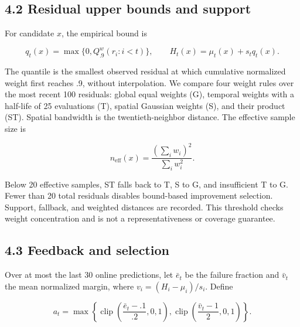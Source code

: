 \documentclass[11pt,a4paper]{article}
\begin{document}
\par{}\noindent\begin{minipage}{\linewidth}

\hypertarget{residual-upper-bounds-and-support}{%
\subsection{4.2 Residual upper bounds and
support}\label{residual-upper-bounds-and-support}}

For candidate \(x\), the empirical bound is

\[q_t(x)=\max\{0,Q^w_{.9}(r_i:i<t)\},\qquad H_t(x)=\mu_t(x)+s_tq_t(x).\]

\end{minipage}\par

\par\noindent\begin{minipage}{\linewidth}

The quantile is the smallest observed residual at which cumulative
normalized weight first reaches .9, without interpolation. We compare
four weight rules over the most recent 100 residuals: global equal
weights (G), temporal weights with a half-life of 25 evaluations (T),
spatial Gaussian weights (S), and their product (ST). Spatial bandwidth
is the twentieth-neighbor distance. The effective sample size is

\[n_{\mathrm{eff}}(x)=\frac{(\sum_iw_i)^2}{\sum_iw_i^2}.\]

\end{minipage}\par

Below 20 effective samples, ST falls back to T, S to G, and insufficient
T to G. Fewer than 20 total residuals disables bound-based improvement
selection. Support, fallback, and weighted distances are recorded. This
threshold checks weight concentration and is not a representativeness or
coverage guarantee.

\par{}\noindent\begin{minipage}{\linewidth}

\hypertarget{feedback-and-selection}{%
\subsection{4.3 Feedback and selection}\label{feedback-and-selection}}

Over at most the last 30 online predictions, let \(\bar e_t\) be the
failure fraction and \(\bar v_t\) the mean normalized margin, where
\(v_i=(H_i-\mu_i)/s_i\). Define

\[a_t=\max\left\{\operatorname{clip}\left(\frac{\bar e_t-.1}{.2},0,1\right),\operatorname{clip}\left(\frac{\bar v_t-1}{2},0,1\right)\right\}.\]

\end{minipage}\par
\end{document}
